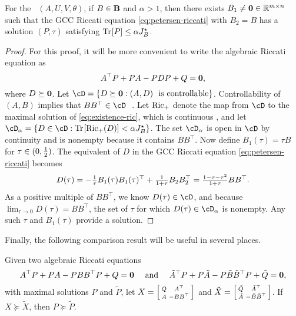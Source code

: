\begin{lemma}
\label{lem:petersen-existence}
	For the \DDFproblem\ $(A, U, V, \theta)$, if $B \in \mathbf{B}$ and $\alpha > 1$,
	then there exists $B_1 \neq \mathbf{0} \in \mathbb{R}^{m \times n}$
	such that the GCC Riccati equation \eqref{eq:petersen-riccati}
	with $B_2 = B$
	has a solution $(P, \tau)$
	satisfying
	$\mathrm{Tr} \hspace{-1pt} \left[ P \right] \leq \alpha J^\star_{B}$.
\end{lemma}
\begin{proof}
	For this proof, it will be more convenient to write the algebraic Riccati equation as
	\begin{equation}
		\label{eq:existence-ric}
		A^\top P + P A - P D P + Q = \mathbf{0},
	\end{equation}
	where $D \succeq \mathbf{0}$.
	Let $\cD = \{ D \succeq \zero: (A, D)\ \text{ is controllable} \}$.
	Controllability of $(A, B)$
	implies that
	$BB^\top \in \cD\ $
	.
	Let $\mathrm{Ric}_+$ denote the map from $\cD$ to the
	maximal solution of \eqref{eq:existence-ric},
	which is continuous %
	,
	and let $\cD_\alpha = \{D \in \cD : \trace{\Ric_+(D)} < \alpha J^\star_B \}$.
	The set $\cD_\alpha$ is open in $\cD$ by continuity
	and is nonempty because it contains $BB^\top$.
	Now define $B_1(\tau) = \tau B$ for $\tau \in (0, \frac{1}{2})$.
	The equivalent of $D$ in the GCC Riccati equation \eqref{eq:petersen-riccati} becomes
	\[
		\textstyle D(\tau) = -\frac{1}{\tau} B_1(\tau) B_1(\tau)^\top + \frac{1}{1 + \tau} B_2 B_2^\top
		= \frac{1 - \tau - \tau^2}{1 + \tau} B B^\top.
	\]
	As a positive multiple of $B B^\top$, we know $D(\tau) \in \cD$,
	and because $\lim_{\tau \to 0} D(\tau) = B B^\top$,
	the set of $\tau$ for which $D(\tau) \in \cD_\alpha$ is nonempty.
	Any such $\tau$ and $B_1(\tau)$ provide a solution.
\end{proof}

\noindent Finally, the following comparison result
will be useful in several places.

\begin{lemma}
\label{lem:lancaster-ARE-domination}
\newcommand{\alt}[1]{\tilde #1}
	Given two algebraic Riccati equations
	\[
		A^\top P + PA - P B B^\top P + Q = \zero
		\quad \text{ and } \quad 
		\alt{A}^\top P + P\alt{A} - P \alt{B}\alt{B}^\top P + \alt{Q} = \zero,
	\]
	with maximal solutions $P$ and $\alt{P}$,
	let
		$X = \begin{bsmallmatrix} Q & A^\top \\ A & -BB^\top \end{bsmallmatrix}$
		and
		$\alt{X} = \bsmallmat{\alt{Q} & \alt{A}^\top \\ \alt{A} & -\alt{B}\alt{B}^\top}$.
	If $X \!\succeq \!\alt{X}$, then $P \!\succeq \!\alt{P}$.
\end{lemma}

